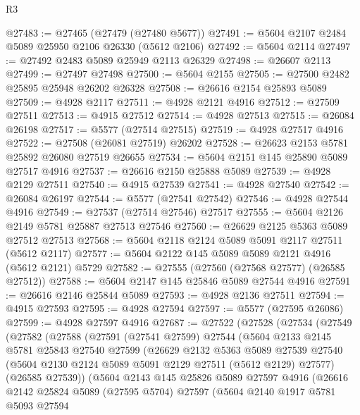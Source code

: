 \begin{lexlean}{R3}
\begin{coremodule}
@27483 := @27465 (@27479 (@27480 @5677))
@27491 := @5604 @2107 @2484 @5089 @25950 @2106 @26330 (@5612 @2106)
@27492 := @5604 @2114
@27497 := @27492 @2483 @5089 @25949 @2113 @26329
@27498 := @26607 @2113
@27499 := @27497 @27498
@27500 := @5604 @2155
@27505 := @27500 @2482 @25895 @25948 @26202 @26328
@27508 := @26616 @2154 @25893 @5089
@27509 := @4928 @2117
@27511 := @4928 @2121 @4916
@27512 := @27509 @27511
@27513 := @4915 @27512
@27514 := @4928 @27513
@27515 := @26084 @26198
@27517 := @5577 (@27514 @27515)
@27519 := @4928 @27517 @4916
@27522 := @27508 (@26081 @27519) @26202
@27528 := @26623 @2153 @5781 @25892 @26080 @27519 @26655
@27534 := @5604 @2151 @145 @25890 @5089 @27517 @4916
@27537 := @26616 @2150 @25888 @5089
@27539 := @4928 @2129 @27511
@27540 := @4915 @27539
@27541 := @4928 @27540
@27542 := @26084 @26197
@27544 := @5577 (@27541 @27542)
@27546 := @4928 @27544 @4916
@27549 := @27537 (@27514 @27546) @27517
@27555 := @5604 @2126 @2149 @5781 @25887 @27513 @27546
@27560 := @26629 @2125 @5363 @5089 @27512 @27513
@27568 := @5604 @2118 @2124 @5089 @5091 @2117 @27511 (@5612 @2117)
@27577 := @5604 @2122 @145 @5089 @5089 @2121 @4916 (@5612 @2121) @5729
@27582 := @27555 (@27560 (@27568 @27577) (@26585 @27512))
@27588 := @5604 @2147 @145 @25846 @5089 @27544 @4916
@27591 := @26616 @2146 @25844 @5089
@27593 := @4928 @2136 @27511
@27594 := @4915 @27593
@27595 := @4928 @27594
@27597 := @5577 (@27595 @26086)
@27599 := @4928 @27597 @4916
@27687 := @27522
    (@27528
      (@27534
        (@27549
          (@27582
            (@27588
              (@27591
                (@27541 @27599)
                @27544
                (@5604
                  @2133
                  @2145
                  @5781
                  @25843
                  @27540
                  @27599
                  (@26629
                    @2132
                    @5363
                    @5089
                    @27539
                    @27540
                    (@5604 @2130 @2124 @5089 @5091 @2129 @27511 (@5612 @2129) @27577)
                    (@26585 @27539))
                  (@5604
                    @2143
                    @145
                    @25826
                    @5089
                    @27597
                    @4916
                    (@26616
                      @2142
                      @25824
                      @5089
                      (@27595 @5704)
                      @27597
                      (@5604
                        @2140
                        @1917
                        @5781
                        @5093
                        @27594

\end{coremodule}
\end{lexlean}
